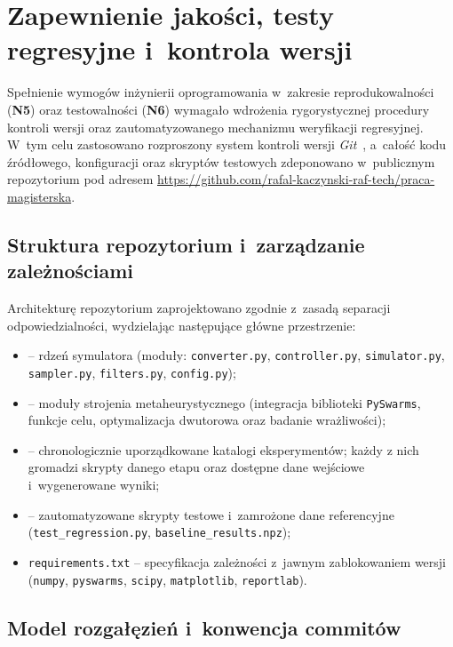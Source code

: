 \section{Zapewnienie jakości, testy regresyjne i~kontrola wersji}
\label{sec:repo}

Spełnienie wymogów inżynierii oprogramowania w~zakresie reprodukowalności (\textbf{N5}) oraz testowalności (\textbf{N6}) wymagało wdrożenia rygorystycznej procedury kontroli wersji oraz zautomatyzowanego mechanizmu weryfikacji regresyjnej. W~tym celu zastosowano rozproszony system kontroli wersji \emph{Git}~\cite{chacon2014progit}, a~całość kodu źródłowego, konfiguracji oraz skryptów testowych zdeponowano w~publicznym repozytorium pod adresem \url{https://github.com/rafal-kaczynski-raf-tech/praca-magisterska}.

\subsection{Struktura repozytorium i~zarządzanie zależnościami}
\label{subsec:struktura-repo}

Architekturę repozytorium zaprojektowano zgodnie z~zasadą separacji odpowiedzialności, wydzielając następujące główne przestrzenie:
\begin{itemize}
    \item {} -- rdzeń symulatora (moduły: \texttt{converter.py}, \texttt{controller.py}, \texttt{simulator.py}, \texttt{sampler.py}, \texttt{filters.py}, \texttt{config.py});
    \item {} -- moduły strojenia metaheurystycznego (integracja biblioteki \texttt{PySwarms}, funkcje celu, optymalizacja dwutorowa oraz badanie wrażliwości);
    \item {} -- chronologicznie uporządkowane katalogi eksperymentów; każdy z nich gromadzi skrypty danego etapu oraz dostępne dane wejściowe i~wygenerowane wyniki;
    \item {} -- zautomatyzowane skrypty testowe i~zamrożone dane referencyjne (\texttt{test\_regression.py}, \texttt{baseline\_results.npz});
    \item \texttt{requirements.txt} -- specyfikacja zależności z~jawnym zablokowaniem wersji (\texttt{numpy}, \texttt{pyswarms}, \texttt{scipy}, \texttt{matplotlib}, \texttt{reportlab}).
\end{itemize}

\subsection{Model rozgałęzień i~konwencja commitów}
\label{subsec:gitflow}

